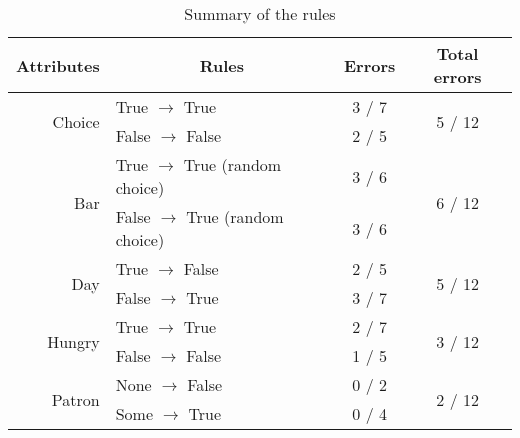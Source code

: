 \documentclass[fontsize=12pt, usenames, dvipsnames, headinclude, headsepline, footinclude, footsepline]{scrartcl}
\begin{document}
\begin{table}[h]
\centering
\caption{Summary of the rules}
\begin{tabular}{@{}rlcc@{}}
\toprule
\multicolumn{1}{c}{Attributes}              & \multicolumn{1}{c}{Rules}                           & \multicolumn{1}{c}{Errors} & \multicolumn{1}{c}{Total errors}            \\ \midrule
\multicolumn{1}{r}{\multirow{2}{*}{Choice}} & \multicolumn{1}{l}{True $\to$ True}                 & \multicolumn{1}{c}{3 / 7}  & \multicolumn{1}{c}{\multirow{2}{*}{5 / 12}} \\
\multicolumn{1}{r}{}                        & \multicolumn{1}{l}{False $\to$ False}               & \multicolumn{1}{c}{2 / 5}  & \multicolumn{1}{c}{}                        \\ \midrule
\multicolumn{1}{r}{\multirow{2}{*}{Bar}}    & \multicolumn{1}{l}{True $\to$ True (random choice)} & \multicolumn{1}{c}{3 / 6}  & \multicolumn{1}{c}{\multirow{2}{*}{6 / 12}} \\
\multicolumn{1}{r}{}                        & False $\to$ True (random choice)                    & 3 / 6                      & \multicolumn{1}{c}{}                        \\ \midrule
\multirow{2}{*}{Day}                        & True $\to$ False                                    & 2 / 5                      & \multirow{2}{*}{5 / 12}                     \\
                                            & False $\to$ True                                    & 3 / 7                      &                                             \\ \midrule
\multirow{2}{*}{Hungry}                     & True $\to$ True                                     & 2 / 7                      & \multirow{2}{*}{3 / 12}                     \\
                                            & False $\to$ False                                   & 1 / 5                      &                                             \\ \midrule
\multirow{3}{*}{Patron}                     & None $\to$ False                                    & 0 / 2                      & \multirow{3}{*}{2 / 12}                     \\
                                            & Some $\to$ True                                     & 0 / 4                      &                                             \\

\end{tabular}
\end{table}
\end{document}
